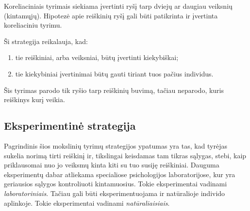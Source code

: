Koreliaciniais tyrimais siekiama įvertinti ryšį tarp dviejų ar daugiau 
veiksnių (kintamųjų). Hipotezė apie reiškinių ryšį gali būti patikrinta ir 
įvertinta koreliaciniu tyrimu. 

Ši strategija reikalauja, kad: 
\begin{enumerate}
  \item tie reiškiniai, arba veiksniai, būtų įvertinti kiekybiškai;
  \item tie kiekybiniai įvertinimai būtų gauti tiriant tuos pačius individus.
\end{enumerate}

Šis tyrimas parodo tik ryšio tarp reiškinių buvimą, tačiau neparodo, kuris
reiškinys kurį veikia. 

\subsection{Eksperimentinė strategija}

Pagrindinis šios mokslinių tyrimų strategijos ypatumas yra tas, kad tyrėjas 
sukelia norimą tirti reiškinį ir, tikslingai keisdamas tam tikras sąlygas, 
stebi, kaip priklausomai nuo jo veiksmų kinta kiti su tuo susiję reiškiniai.
Dauguma eksperimentų dabar atliekama specialiose psichologijos laboratorijose,
kur yra geriausios sąlygos kontroliuoti kintamuosius. Tokie eksperimentai 
vadinami \emph{laboratoriniais}. Tačiau gali būti eksperimentuojama ir 
natūralioje individo aplinkoje. Tokie eksperimentai vadinami 
\emph{natūraliaisiais}.
